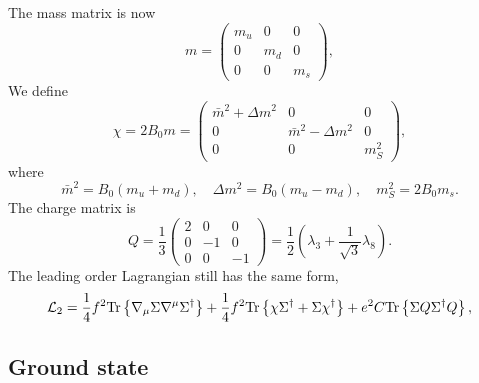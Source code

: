 The mass matrix is now
%
\begin{equation}
    m = 
    \begin{pmatrix}
        m_u & 0 & 0 \\
        0 & m_d & 0 \\
        0 & 0 & m_s
    \end{pmatrix},
\end{equation}
%
We define 
%
%
\begin{equation}
    \chi = 2B_0 m = 
    \begin{pmatrix}
        \bar m^2 + \Delta m^2 & 0 &0\\
        0& \bar m^2 - \Delta m^2 & 0 \\
        0&0&m_S^2
    \end{pmatrix},
\end{equation}
%
where
%
\begin{equation}
    \bar m^2 =  B_0(m_u + m_d),\quad 
    \Delta m^2 = B_0(m_u - m_d), \quad
    m_S^2 = 2B_0 m_s.
\end{equation}
%
The charge matrix is
%
\begin{equation}
    \label{three-flavor charge matrix}
    Q = \frac{1}{3}
    \begin{pmatrix}
        2 & 0 & 0\\
        0 & -1 & 0\\
        0 & 0 & -1
    \end{pmatrix}
    = \frac{1}{2} \left( \lambda_3 + \frac{1}{\sqrt{3}} \lambda_8 \right).
\end{equation}
%
The leading order Lagrangian still has the same form,
%
\begin{equation}
    \label{leading order three-flavor lagrangian}
    \mathcal{L}_2 
    = \frac{1}{4}f^2 \text{Tr} \left\{ \nabla_\mu \Sigma \nabla^\mu \Sigma^\dagger \right\}
    + \frac{1}{4}f^2 \text{Tr} \left\{ \chi \Sigma^\dagger + \Sigma \chi^\dagger \right\}
    + e^2 C \text{Tr} \left\{ \Sigma Q \Sigma^\dagger Q \right\},
\end{equation}
%


\subsection{Ground state}

